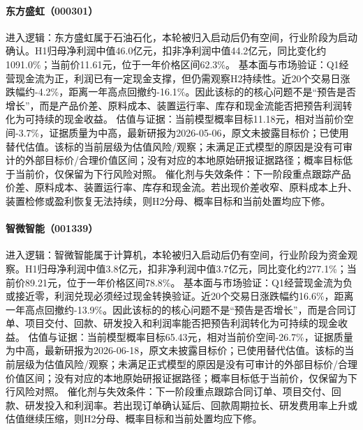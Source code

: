 \paragraph{东方盛虹（000301）}
进入逻辑：东方盛虹属于石油石化，本轮被归入启动后仍有空间，行业阶段为启动确认。H1归母净利润中值46.0亿元，扣非净利润中值44.2亿元，同比变化约1091.0\%；当前价11.61元，位于一年价格区间62.3\%。
基本面与市场验证：Q1经营现金流为正，利润已有一定现金支撑，但仍需观察H2持续性。近20个交易日涨跌幅约-4.2\%，距离一年高点回撤约-16.1\%。因此该标的的核心问题不是“预告是否增长”，而是产品价差、原料成本、装置运行率、库存和现金流能否把预告利润转化为可持续的现金收益。
估值与证据：当前模型概率目标11.18元，相对当前价空间-3.7\%，证据质量为中高，最新研报为2026-05-06，原文未披露目标价；已使用替代估值。该标的当前层级为估值风险/观察；未满足正式模型的原因是没有可审计的外部目标价/合理价值区间；没有对应的本地原始研报证据路径；概率目标低于当前价，仅保留为下行风险对照。
催化剂与失效条件：下一阶段重点跟踪产品价差、原料成本、装置运行率、库存和现金流。若出现价差收窄、原料成本上升、装置检修或盈利恢复无法持续，则H2分母、概率目标和当前处置均应下修。

\paragraph{智微智能（001339）}
进入逻辑：智微智能属于计算机，本轮被归入启动后仍有空间，行业阶段为资金观察。H1归母净利润中值3.8亿元，扣非净利润中值3.7亿元，同比变化约277.1\%；当前价89.21元，位于一年价格区间78.8\%。
基本面与市场验证：Q1经营现金流为负或接近零，利润兑现必须经过现金转换验证。近20个交易日涨跌幅约16.6\%，距离一年高点回撤约-13.9\%。因此该标的的核心问题不是“预告是否增长”，而是合同订单、项目交付、回款、研发投入和利润率能否把预告利润转化为可持续的现金收益。
估值与证据：当前模型概率目标65.43元，相对当前价空间-26.7\%，证据质量为中高，最新研报为2026-06-18，原文未披露目标价；已使用替代估值。该标的当前层级为估值风险/观察；未满足正式模型的原因是没有可审计的外部目标价/合理价值区间；没有对应的本地原始研报证据路径；概率目标低于当前价，仅保留为下行风险对照。
催化剂与失效条件：下一阶段重点跟踪合同订单、项目交付、回款、研发投入和利润率。若出现订单确认延后、回款周期拉长、研发费用率上升或估值继续压缩，则H2分母、概率目标和当前处置均应下修。

